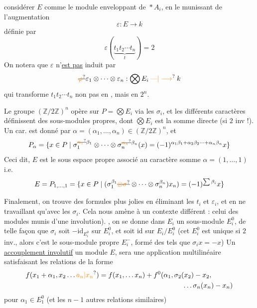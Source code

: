 considérer $E$ comme le module enveloppant de $\mathop{\ast}A_i$, en le munissant de l'augmentation
\[
 \varepsilon:E\longrightarrow k
\]
définie par
\[
 \varepsilon(\underbrace{t_1t_2\cdots t_n}_{t})=2
\]
On notera que $\varepsilon$ n'\uline{est pas} induit par
\[
 \deleted{\unsure{\varphi}}\varepsilon_1\otimes\cdots\otimes\varepsilon_n:\bigotimes E_i\mathbin{\unsure{\text{---}|\longrightarrow}}k
\]
qui transforme $t_1t_2\cdots t_n$ non pas en , mais en $2^n$.

Le groupe $(\mathbb Z/2\mathbb Z)^n$ opère sur $P=\bigotimes E_i$ via les $\sigma_i$, et les différents caractères définissent des sous-modules propres, dont $\bigotimes E_i$ est la somme directe (si $2$ inv !). Un car. est donné par $\alpha=(\alpha_1,\ldots,\alpha_n)\in(\mathbb Z/2\mathbb Z)^n$, et 
\[
 P_\alpha=\{x\in P\mid \sigma_1^{\deleted{\unsure{\alpha_1}}\beta_1}\otimes\cdots\otimes\sigma_n^{\deleted{\unsure{\alpha_n}}\beta_n}(x)=(-1)^{\alpha_1\beta_1+\alpha_2\beta_2\cdots+\alpha_n\beta_n}x\}
\]
Ceci dit, $E$ est le sous espace propre associé au caractère somme $\alpha=(1,\ldots,1)$ i.e.
\[
 E=P_{1,\ldots,1}=\{x\in P\mid(\sigma_1^{\beta_1}\deleted{\unsure{\otimes\sigma}}\otimes\cdots\otimes\sigma_n^{\beta_n})x_n)=(-1)^{\sum\beta_i}x\}
\]

Finalement, on trouve des formules plus jolies en éliminant les $t_i$ et $\varepsilon_i$, et en ne travaillant qu'avec les $\sigma_i$. Cela nous amène à un contexte différent : celui des  modules  munis d'une involution). , on se donne dans $E_i$ un sous-module $E_i^0$, de telle façon que $\sigma_i$ soit $-\mathrm{id}_{E_i^0}$ sur $E_i^0$, et soit id sur $E_i/E_i^0$ (cet $E_i^0$ est  unique  si $2$ inv., alors c'est le sous-module propre $E_i^-$, formé des  tels que $\sigma_i x=-x$) Un \uline{accouplement involutif}   un module $E$, sera une application multilinéaire
satisfaisant les relations de la forme
\[
 \begin{aligned}
 f(x_1+\alpha_1,x_2\ldots \unsure{a_n|x_n})&=f(x_1,\ldots x_n)+f^0(\alpha_1,\sigma_2(x_2)-x_2,\\
 &\hspace{12em}\ldots\sigma_n(x_n)-x_n)
 \end{aligned}
\]
pour $\alpha_1\in E_1^0$ (et les $n-1$ autres relations similaires)

